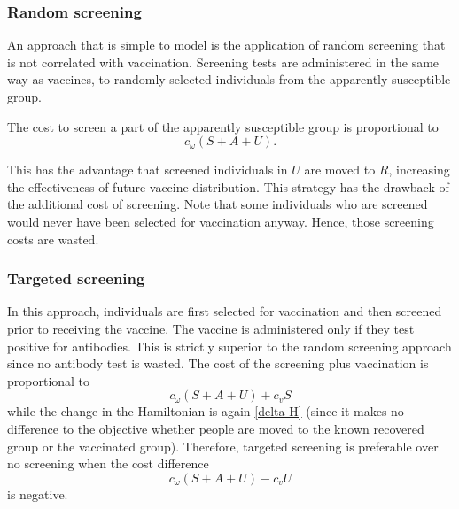 \documentclass[english,12pt,letter]{article}
\begin{document}
\subsubsection{Random screening}
An approach that is simple to model is the application of random screening
that is not correlated with vaccination.  Screening tests are administered
in the same way as vaccines, to randomly selected individuals from the
apparently susceptible group.  

The cost to screen a part of the apparently susceptible group is proportional to
$$
c_\omega (S + A + U).
$$

This has the advantage that screened individuals in $U$ are moved to $R$,
increasing the effectiveness of future vaccine distribution.
This strategy has the drawback of the additional cost of screening.  Note that
some individuals who are screened would never have
been selected for vaccination anyway.  Hence, those screening costs are wasted.

\subsubsection{Targeted screening}
In this approach, individuals are first selected for vaccination and then screened
prior to receiving the vaccine.  The vaccine is administered only if they test
positive for antibodies.  This is strictly superior to the random screening
approach since no antibody test is wasted.  The cost of the screening plus
vaccination is proportional to
$$
    c_\omega (S + A + U) + c_v S
$$
while the change in the Hamiltonian is again \eqref{delta-H} (since
it makes no difference to the objective whether people are moved to the
known recovered group or the vaccinated group).
Therefore, targeted screening is preferable over no screening when the cost
difference
$$
    c_\omega (S + A + U) - c_v U
$$
is negative.
\end{document}
